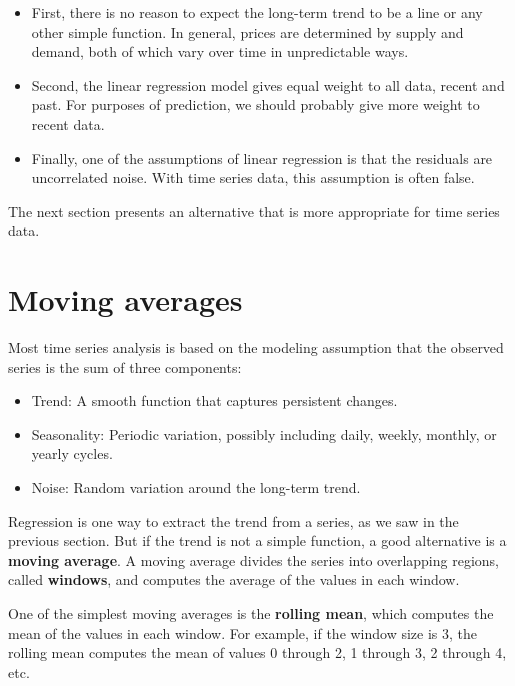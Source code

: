 \documentclass[12pt]{book}
\begin{document}
\begin{itemize}

\item First, there is no reason to expect the long-term trend to be a
  line or any other simple function.  In general, prices are
  determined by supply and demand, both of which vary over time in
  unpredictable ways.

\item Second, the linear regression model gives equal weight to all
  data, recent and past.  For purposes of prediction, we should
  probably give more weight to recent data.

\item Finally, one of the assumptions of linear regression is that the
  residuals are uncorrelated noise.  With time series data, this
  assumption is often false.

\end{itemize}

The next section presents an alternative that is more appropriate
for time series data.


\section{Moving averages}

Most time series analysis is based on the modeling assumption that the
observed series is the sum of three components:

\begin{itemize}

\item Trend: A smooth function that captures persistent changes.

\item Seasonality: Periodic variation, possibly including daily,
weekly, monthly, or yearly cycles.

\item Noise: Random variation around the long-term trend.

\end{itemize}

Regression is one way to extract the trend from a series, as we
saw in the previous section.  But if the trend is not a simple
function, a good alternative is a {\bf moving average}.  A moving
average divides the series into overlapping regions, called {\bf windows},
and computes the average of the values in each window.

One of the simplest moving averages is the {\bf rolling mean}, which
computes the mean of the values in each window.  For example, if
the window size is 3, the rolling mean computes the mean of
values 0 through 2, 1 through 3, 2 through 4, etc.
\end{document}
